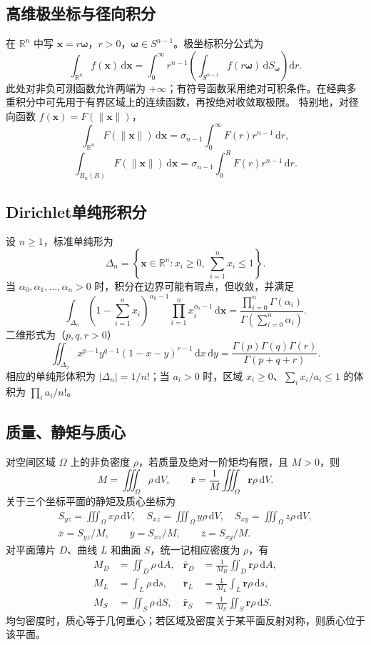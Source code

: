 \documentclass[../main.tex]{subfiles}
\begin{document}
\subsection{高维极坐标与径向积分}
在 $\mathbb R^n$ 中写 $\bm x=r\bm\omega$，$r>0$，$\bm\omega\in S^{n-1}$。极坐标积分公式为
\[
\int_{\mathbb R^n}f(\bm x)\,\mathrm d\bm x
=\int_0^\infty r^{n-1}
\left(\int_{S^{n-1}}f(r\bm\omega)\,\mathrm dS_{\bm\omega}\right)\mathrm dr.
\]
此处对非负可测函数允许两端为 $+\infty$；有符号函数采用绝对可积条件。在经典多重积分中可先用于有界区域上的连续函数，再按绝对收敛取极限。
特别地，对径向函数 $f(\bm x)=F(\|\bm x\|)$，
\[
\int_{\mathbb R^n}F(\|\bm x\|)\,\mathrm d\bm x
=\sigma_{n-1}\int_0^\infty F(r)r^{n-1}\,\mathrm dr,
\]
\[
\int_{B_n(R)}F(\|\bm x\|)\,\mathrm d\bm x
=\sigma_{n-1}\int_0^RF(r)r^{n-1}\,\mathrm dr.
\]
\subsection{Dirichlet单纯形积分}
设 $n\ge1$，标准单纯形为
\[
\Delta_n=\left\{\bm x\in\mathbb R^n:x_i\ge0,\ \sum_{i=1}^nx_i\le1\right\}.
\]
当 $\alpha_0,\alpha_1,\ldots,\alpha_n>0$ 时，积分在边界可能有瑕点，但收敛，并满足
\[
\int_{\Delta_n}\left(1-\sum_{i=1}^nx_i\right)^{\alpha_0-1}
\prod_{i=1}^nx_i^{\alpha_i-1}\,\mathrm d\bm x
=\frac{\prod_{i=0}^n\Gamma(\alpha_i)}
{\Gamma\!\left(\sum_{i=0}^n\alpha_i\right)}.
\]
二维形式为（$p,q,r>0$）
\[
\iint_{\Delta_2}x^{p-1}y^{q-1}(1-x-y)^{r-1}\,\mathrm dx\,\mathrm dy
=\frac{\Gamma(p)\Gamma(q)\Gamma(r)}{\Gamma(p+q+r)}.
\]
相应的单纯形体积为 $|\Delta_n|=1/n!$；当 $a_i>0$ 时，区域 $x_i\ge0$、$\sum_i x_i/a_i\le1$ 的体积为 $\prod_i a_i/n!$。
\subsection{质量、静矩与质心}
对空间区域 $\Omega$ 上的非负密度 $\rho$，若质量及绝对一阶矩均有限，且 $M>0$，则
\[
M=\iiint_\Omega\rho\,\mathrm dV,\qquad
\bar{\bm r}=\frac1M\iiint_\Omega\bm r\rho\,\mathrm dV.
\]
关于三个坐标平面的静矩及质心坐标为
\begin{gather*}
S_{yz}=\iiint_\Omega x\rho\,\mathrm dV,\quad
S_{xz}=\iiint_\Omega y\rho\,\mathrm dV,\quad
S_{xy}=\iiint_\Omega z\rho\,\mathrm dV,\\
\bar x=S_{yz}/M,\qquad \bar y=S_{xz}/M,\qquad \bar z=S_{xy}/M.
\end{gather*}
对平面薄片 $D$、曲线 $L$ 和曲面 $S$，统一记相应密度为 $\rho$，有
\begin{align*}
M_D&=\iint_D\rho\,\mathrm dA,
&\bar{\bm r}_D&=\frac1{M_D}\iint_D\bm r\rho\,\mathrm dA,\\
M_L&=\int_L\rho\,\mathrm ds,
&\bar{\bm r}_L&=\frac1{M_L}\int_L\bm r\rho\,\mathrm ds,\\
M_S&=\iint_S\rho\,\mathrm dS,
&\bar{\bm r}_S&=\frac1{M_S}\iint_S\bm r\rho\,\mathrm dS.
\end{align*}
均匀密度时，质心等于几何重心；若区域及密度关于某平面反射对称，则质心位于该平面。
\end{document}
